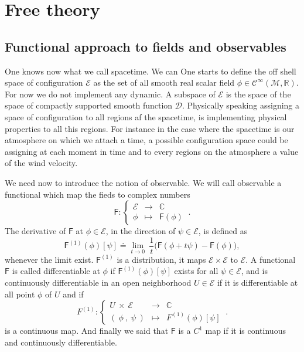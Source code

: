 \documentclass[11pt]{book}
\newcommand{\Ccal}{\mathcal{C}}
\newcommand{\Dcal}{\mathcal{D}}
\newcommand{\Ecal}{\mathcal{E}}
\newcommand{\Mcal}{\mathcal{M}}
\newcommand{\Cbb}{\mathbb{C}}
\newcommand{\Rbb}{\mathbb{R}}
\newcommand{\Fsf}{\mathsf{F}}
\begin{document}
\chapter{Free theory}

\section{Functional approach to fields and observables}


One knows now what we call spacetime. We can 
One starts to define the off shell space of configuration $\Ecal$ as the set of all smooth real scalar field $\phi \in \Ccal^\infty\left(\Mcal,\Rbb\right)$. For now we do not implement any dynamic. A subspace of $\Ecal$ is the space of the space of compactly supported smooth function $\Dcal$. Physically speaking assigning a space of configuration to all regions af the spacetime, is implementing physical properties to all this regions. For instance in the case where the spacetime is our atmosphere on which we attach a time, a possible configuration space could be assigning at each moment in time and to every regions on the atmosphere a value of the wind velocity.\par%


We need now to introduce the notion of observable. We will call observable a functional which map the fieds to complex numbers%
%
\begin{equation*}
\Fsf : \left\{
\begin{array}{ccc}
\Ecal & \to     & \Cbb \\
\phi  & \mapsto & \Fsf(\phi)
\end{array}
\right. \ .
\end{equation*}
%
The derivative of $\Fsf$ at $\phi \in \Ecal$, in the direction of $\psi \in \Ecal$, is defined as%
%
\begin{equation*}
\Fsf^{(1)}(\phi)[\psi] \doteq \lim_{t \to 0} \ \frac{1}{t} \big( \Fsf(\phi + t \psi) - \Fsf(\phi) \big),
\end{equation*}
%
whenever the limit exist. $\Fsf^{(1)}$ is a distribution, it maps $\Ecal\times\Ecal$ to $\Ecal$. A functional $\Fsf$ is called differentiable at $\phi$ if $\Fsf^{(1)}(\phi)[\psi]$ exists for all $\psi \in \Ecal$, and is continuously differentiable in an open neighborhood $U \in \Ecal$ if it is differentiable at all point $\phi$ of $U$ and if%
%
\begin{equation*}
F^{(1)} : 
\left\{ 
\begin{array}{lcl}
U \ \times \ \Ecal & \to & \Cbb \\ 
( \ \phi \ , \ \psi \ ) & \mapsto & F^{(1)}(\phi)[\psi]
\end{array}
\right. \ .
\end{equation*}
%
is a continuous map. And finally we said that $\Fsf$ is a $C^{1}$ map if it is continuous and continuously differentiable.\par%
\end{document}
